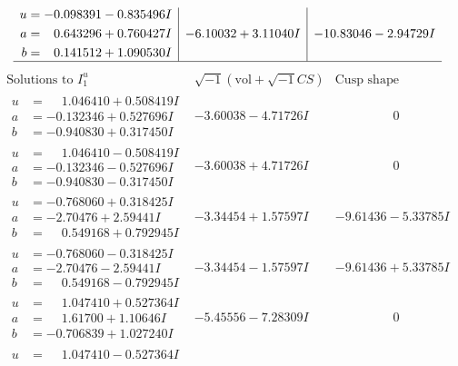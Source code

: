 \documentclass[1p]{elsarticle_modified}
\theoremstyle{definition}
\newcommand{\I}{\sqrt{-1}}
\begin{document}
$$\begin{array}{c|c|c}
\begin{aligned}
u &= -0.098391 - 0.835496 I \\
a &= \phantom{-}0.643296 + 0.760427 I \\
b &= \phantom{-}0.141512 + 1.090530 I\end{aligned}
 & -6.10032 + 3.11040 I & -10.83046 - 2.94729 I\\
 \hline 
 \end{array}$$\newpage$$\begin{array}{c|c|c}  
\text{Solutions to }I^u_{1}& \I (\text{vol} + \sqrt{-1}CS) & \text{Cusp shape}\\
 \hline 
\begin{aligned}
u &= \phantom{-}1.046410 + 0.508419 I \\
a &= -0.132346 + 0.527696 I \\
b &= -0.940830 + 0.317450 I\end{aligned}
 & -3.60038 - 4.71726 I & \phantom{-0.000000 } 0 \\ \hline\begin{aligned}
u &= \phantom{-}1.046410 - 0.508419 I \\
a &= -0.132346 - 0.527696 I \\
b &= -0.940830 - 0.317450 I\end{aligned}
 & -3.60038 + 4.71726 I & \phantom{-0.000000 } 0 \\ \hline\begin{aligned}
u &= -0.768060 + 0.318425 I \\
a &= -2.70476 + 2.59441 I \\
b &= \phantom{-}0.549168 + 0.792945 I\end{aligned}
 & -3.34454 + 1.57597 I & -9.61436 - 5.33785 I \\ \hline\begin{aligned}
u &= -0.768060 - 0.318425 I \\
a &= -2.70476 - 2.59441 I \\
b &= \phantom{-}0.549168 - 0.792945 I\end{aligned}
 & -3.34454 - 1.57597 I & -9.61436 + 5.33785 I \\ \hline\begin{aligned}
u &= \phantom{-}1.047410 + 0.527364 I \\
a &= \phantom{-}1.61700 + 1.10646 I \\
b &= -0.706839 + 1.027240 I\end{aligned}
 & -5.45556 - 7.28309 I & \phantom{-0.000000 } 0 \\ \hline\begin{aligned}
u &= \phantom{-}1.047410 - 0.527364 I \\

\end{aligned}
\end{array}$$
\end{document}
